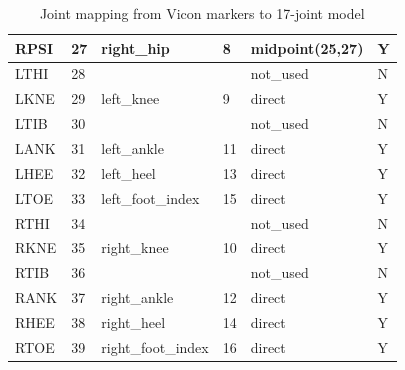 \begin{table}[htbp]
\begin{tabular}{|p{2.5cm}|p{1.5cm}|p{3.5cm}|p{2.0cm}|p{3.0cm}|p{1.5cm}|}
RPSI & 27 & right\_hip & 8 & midpoint(25,27) & Y \\ \hline
LTHI & 28 &  &  & not\_used & N \\ \hline
LKNE & 29 & left\_knee & 9 & direct & Y \\ \hline
LTIB & 30 &  &  & not\_used & N \\ \hline
LANK & 31 & left\_ankle & 11 & direct & Y \\ \hline
LHEE & 32 & left\_heel & 13 & direct & Y \\ \hline
LTOE & 33 & left\_foot\_index & 15 & direct & Y \\ \hline
RTHI & 34 &  &  & not\_used & N \\ \hline
RKNE & 35 & right\_knee & 10 & direct & Y \\ \hline
RTIB & 36 &  &  & not\_used & N \\ \hline
RANK & 37 & right\_ankle & 12 & direct & Y \\ \hline
RHEE & 38 & right\_heel & 14 & direct & Y \\ \hline
RTOE & 39 & right\_foot\_index & 16 & direct & Y \\ \hline
\end{tabular}
\caption{Joint mapping from Vicon markers to 17-joint model}
\label{tab:T2_joint_mapping}
\end{table}